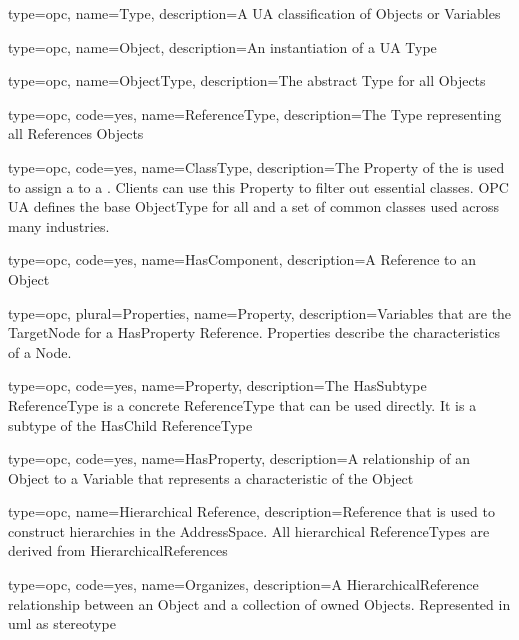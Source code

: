 {
  type=opc,
  name=Type,
  description={A UA classification of \glspl{Object} or \glspl{Variable}}
}

{
  type=opc,
  name=Object,
  description={An instantiation of a UA \gls{Type}}
}

{
  type=opc,
  name=ObjectType,
  description={The abstract \gls{Type} for all \glspl{Object}}
}

{
  type=opc,
  code=yes,
  name=ReferenceType,
  description={The \gls{Type} representing all \glspl{Reference} \glspl{Object}}
}

{
  type=opc,
  code=yes,
  name=ClassType,
  description={The  \gls{Property} of the  is used to assign a  to a . Clients can use this Property to filter out essential classes. OPC UA defines the base \gls{ObjectType} for all  and a set of common classes used across many industries.}
}

{
  type=opc,
  code=yes,
  name=HasComponent,
  description={A \gls{Reference} to an \gls{Object}}
}

{
  type=opc,
  plural=Properties,
  name=Property,
  description={Variables that are the TargetNode for a \gls{HasProperty} Reference. Properties describe the characteristics of a Node.}
}

{
  type=opc,
  code=yes,
  name=Property,
  description={The HasSubtype ReferenceType is a concrete ReferenceType that can be used directly. It is a subtype of the HasChild ReferenceType}
}

{
  type=opc,
  code=yes,
  name=HasProperty,
  description={A relationship of an \gls{Object} to a \gls{Variable} that represents a characteristic of the \gls{Object}}
}

{
  type=opc,
  name={Hierarchical Reference},
  description={Reference that is used to construct hierarchies in the \gls{AddressSpace}. All hierarchical ReferenceTypes are derived from HierarchicalReferences}
}

{
  type=opc,
  code=yes,
  name=Organizes,
  description={A \gls{HierarchicalReference} relationship between an \gls{Object} and a collection of owned \glspl{Object}. Represented in \gls{uml} as  \gls{stereotype}}
}

